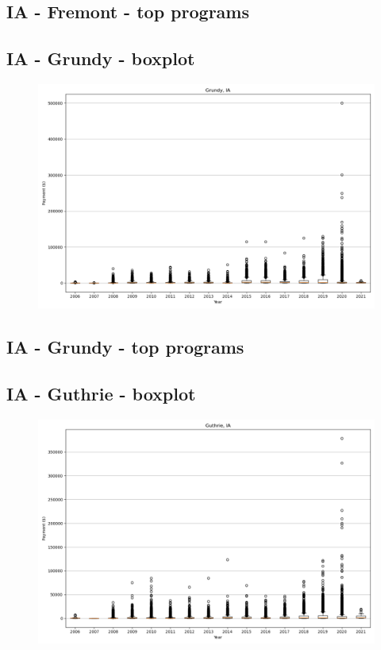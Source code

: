\subsection*{IA - Fremont - top programs}

\newpage
\subsection*{IA - Grundy - boxplot}
\begin{figure}[h]
\centering
\includegraphics[width=7in]{../output/boxplots/counties/Grundy-IA_boxplot.png}
\end{figure}


\subsection*{IA - Grundy - top programs}

\newpage
\subsection*{IA - Guthrie - boxplot}
\begin{figure}[h]
\centering
\includegraphics[width=7in]{../output/boxplots/counties/Guthrie-IA_boxplot.png}
\end{figure}


